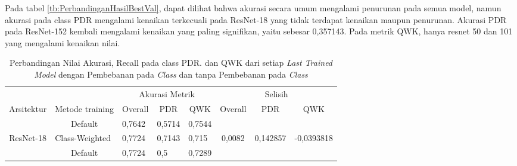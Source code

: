 Pada tabel \ref{tb:PerbandinganHasilBestVal}, dapat dilihat bahwa akurasi secara umum mengalami penurunan pada semua model, namun akurasi pada class PDR mengalami kenaikan terkecuali pada ResNet-18 yang tidak terdapat kenaikan maupun penurunan. Akurasi PDR pada ResNet-152 kembali mengalami kenaikan yang paling signifikan, yaitu sebesar 0,357143. Pada metrik QWK, hanya resnet 50 dan 101 yang mengalami kenaikan nilai.
\pagebreak

\begin{table}[hbtp]
\begin{center}
	\caption{Perbandingan Nilai Akurasi, Recall pada class PDR. dan QWK dari setiap \emph{Last Trained Model} dengan Pembebanan pada \emph{Class} dan tanpa Pembebanan pada \emph{Class}}
	\label{tb:PerbandinganHasilLastTrained}
	\begin{tabular}{|c|c|lll|ccc|}
		\hline
		\cellcolor[HTML]{C0C0C0}                             & \cellcolor[HTML]{C0C0C0}                                  & \multicolumn{3}{c|}{\cellcolor[HTML]{C0C0C0}Akurasi Metrik}                           & \multicolumn{3}{c|}{\cellcolor[HTML]{C0C0C0}Selisih}                                                                            \\ \cline{3-8} 
		\multirow{-2}{*}{\cellcolor[HTML]{C0C0C0}Arsitektur} & \multirow{-2}{*}{\cellcolor[HTML]{C0C0C0}Metode training} & \multicolumn{1}{c|}{Overall} & \multicolumn{1}{c|}{PDR}    & \multicolumn{1}{c|}{QWK} & \multicolumn{1}{c|}{Overall}                   & \multicolumn{1}{c|}{PDR}                        & QWK                          \\ \hline
															 & Default                                                   & \multicolumn{1}{l|}{0,7642}  & \multicolumn{1}{l|}{0,5714} & 0,7544                   & \multicolumn{1}{c|}{}                          & \multicolumn{1}{c|}{}                           &                              \\ \cline{2-5}
		\multirow{-2}{*}{ResNet-18}                          & \multicolumn{1}{l|}{Class-Weighted}                       & \multicolumn{1}{l|}{0,7724}  & \multicolumn{1}{l|}{0,7143} & 0,715                    & \multicolumn{1}{c|}{\multirow{-2}{*}{0,0082}}  & \multicolumn{1}{c|}{\multirow{-2}{*}{0,142857}} & \multirow{-2}{*}{-0,0393818} \\ \hline
															 & Default                                                   & \multicolumn{1}{l|}{0,7724}  & \multicolumn{1}{l|}{0,5}    & 0,7289                   & \multicolumn{1}{c|}{}                          & \multicolumn{1}{c|}{}                           &                              \\ \cline{2-5}

\end{tabular}
\end{center}
\end{table}
